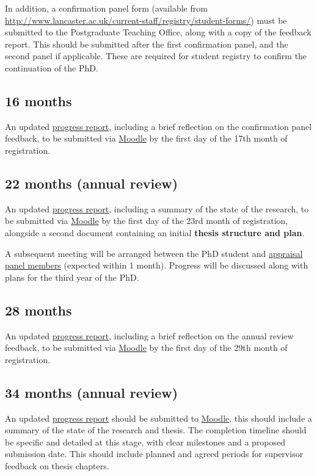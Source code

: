 \documentclass[12pt,a4paper]{article}
\begin{document}
In addition, a confirmation panel form (available from \url{http://www.lancaster.ac.uk/current-staff/registry/student-forms/}) must be submitted to the Postgraduate Teaching Office, along with a copy of the feedback report. This should be submitted after the first confirmation panel, and the second panel if applicable. These are required for student registry to confirm the continuation of the PhD.


\subsection{16 months} \label{sec:16months}
An updated \hyperref[sec:report]{progress report}, including a brief reflection on the confirmation panel feedback, to be submitted via \href{https://modules.lancaster.ac.uk/course/view.php?id=7050}{Moodle} by the first day of the 17th month of registration.


\subsection{22 months (annual review)} \label{sec:22months}
An updated \hyperref[sec:report]{progress report}, including a summary of the state of the research, to be submitted via \href{https://modules.lancaster.ac.uk/course/view.php?id=7050}{Moodle} by the first day of the 23rd month of registration, alongside a second document containing an initial \textbf{thesis structure and plan}.

A subsequent meeting will be arranged between the PhD student and \hyperref[sec:panel]{appraisal panel members} (expected within 1 month). Progress will be discussed along with plans for the third year of the PhD.


\subsection{28 months} \label{sec:28months}
An updated \hyperref[sec:report]{progress report}, including a brief reflection on the annual review feedback, to be submitted via \href{https://modules.lancaster.ac.uk/course/view.php?id=7050}{Moodle} by the first day of the 29th month of registration.


\subsection{34 months (annual review)} \label{sec:34months}
An updated \hyperref[sec:report]{progress report} should be submitted to \href{https://modules.lancaster.ac.uk/course/view.php?id=7050}{Moodle}, this should include a summary of the state of the research and thesis. The completion timeline should be specific and detailed at this stage, with clear milestones and a proposed submission date. This should include planned and agreed periods for supervisor feedback on thesis chapters.
\end{document}
